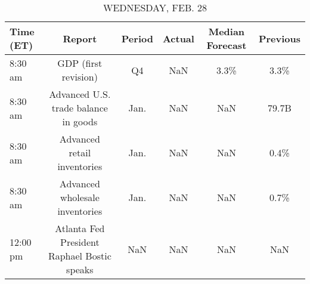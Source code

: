 \documentclass{article}%
\begin{document}
\begin{table}[htbp]%
\caption{WEDNESDAY, FEB. 28}%
\centering%
\begin{adjustbox}{width=1\textwidth}%
\begin{tabular}{lccccc}
\toprule
Time (ET) &                                      Report & Period & Actual & Median Forecast & Previous \\
\midrule
  8:30 am &                        GDP (first revision) &     Q4 &    NaN &            3.3\% &     3.3\% \\
  8:30 am &        Advanced U.S. trade balance in goods &   Jan. &    NaN &             NaN &    79.7B \\
  8:30 am &                 Advanced retail inventories &   Jan. &    NaN &             NaN &     0.4\% \\
  8:30 am &              Advanced wholesale inventories &   Jan. &    NaN &             NaN &     0.7\% \\
 12:00 pm & Atlanta Fed President Raphael Bostic speaks &    NaN &    NaN &             NaN &      NaN \\
\bottomrule
\end{tabular}
%
\end{adjustbox}%
\end{table}

%
\end{document}
